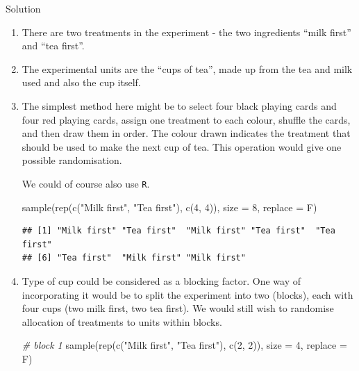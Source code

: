 \documentclass[
]{book}
\newenvironment{Shaded}{\begin{snugshade}}{\end{snugshade}}
\newcommand{\AttributeTok}[1]{\textcolor[rgb]{0.77,0.63,0.00}{#1}}
\newcommand{\CommentTok}[1]{\textcolor[rgb]{0.56,0.35,0.01}{\textit{#1}}}
\newcommand{\DecValTok}[1]{\textcolor[rgb]{0.00,0.00,0.81}{#1}}
\newcommand{\FunctionTok}[1]{\textcolor[rgb]{0.00,0.00,0.00}{#1}}
\newcommand{\NormalTok}[1]{#1}
\newcommand{\StringTok}[1]{\textcolor[rgb]{0.31,0.60,0.02}{#1}}
\theoremstyle{definition}
\theoremstyle{definition}
\theoremstyle{definition}
\theoremstyle{definition}
\theoremstyle{remark}
\begin{document}
Solution

\begin{enumerate}
\def\labelenumi{\alph{enumi}.}
\item
  There are two treatments in the experiment - the two ingredients ``milk first'' and ``tea first''.
\item
  The experimental units are the ``cups of tea'', made up from the tea and milk used and also the cup itself.
\item
  The simplest method here might be to select four black playing cards and four red playing cards, assign one treatment to each colour, shuffle the cards, and then draw them in order. The colour drawn indicates the treatment that should be used to make the next cup of tea. This operation would give one possible randomisation.

  We could of course also use \texttt{R}.

\begin{Shaded}
\begin{Highlighting}[]
\FunctionTok{sample}\NormalTok{(}\FunctionTok{rep}\NormalTok{(}\FunctionTok{c}\NormalTok{(}\StringTok{"Milk first"}\NormalTok{, }\StringTok{"Tea first"}\NormalTok{), }\FunctionTok{c}\NormalTok{(}\DecValTok{4}\NormalTok{, }\DecValTok{4}\NormalTok{)), }\AttributeTok{size =} \DecValTok{8}\NormalTok{, }\AttributeTok{replace =}\NormalTok{ F)}
\end{Highlighting}
\end{Shaded}

\begin{verbatim}
## [1] "Milk first" "Tea first"  "Milk first" "Tea first"  "Tea first" 
## [6] "Tea first"  "Milk first" "Milk first"
\end{verbatim}
\item
  Type of cup could be considered as a blocking factor. One way of incorporating it would be to split the experiment into two (blocks), each with four cups (two milk first, two tea first). We would still wish to randomise allocation of treatments to units within blocks.

\begin{Shaded}
\begin{Highlighting}[]
\CommentTok{\# block 1}
\FunctionTok{sample}\NormalTok{(}\FunctionTok{rep}\NormalTok{(}\FunctionTok{c}\NormalTok{(}\StringTok{"Milk first"}\NormalTok{, }\StringTok{"Tea first"}\NormalTok{), }\FunctionTok{c}\NormalTok{(}\DecValTok{2}\NormalTok{, }\DecValTok{2}\NormalTok{)), }\AttributeTok{size =} \DecValTok{4}\NormalTok{, }\AttributeTok{replace =}\NormalTok{ F)}
\end{Highlighting}
\end{Shaded}


\end{enumerate}
\end{document}
